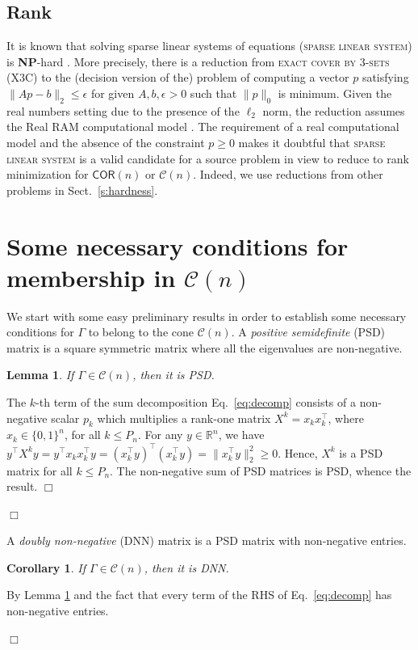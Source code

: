 \documentclass[envcountsect,envcountsame]{svjour3}
\theoremstyle{changebreak}                %
\newtheorem{lemma}[result]{Lemma}
\newtheorem{corollary}[result]{Corollary}
\newenvironment{proof}
 {{\sl Proof.}\hspace*{1 ex}}%
 {{\nopagebreak\hspace*{\fill}$\Box$\par\vspace{12pt}}}
\newcommand{\qed}{\hfill \ensuremath{\Box}}
\newcommand{\transpose}[1]{{#1}^{\top}}
\newcommand{\COR}[1]{\mathsf{COR}(#1)}
\newcommand{\CONX}[1]{\mathcal{C}(#1)}
\begin{document}
\subsection{Rank}
It is known that solving sparse linear systems of equations (\textsc{sparse linear system}) is \textbf{NP}-hard \cite{natarajan}. More precisely, there is a reduction from \textsc{exact cover by 3-sets} (X3C) to the (decision version of the) problem of computing a vector $p$ satisfying $\|Ap-b\|_2\le\epsilon$ for given $A,b,\epsilon>0$ such that $\|p\|_0$ is minimum. Given the real numbers setting due to the presence of the $\ell_2$ norm, the reduction assumes the Real RAM computational model \cite[\S 1.4]{preparata}. The requirement of a real computational model and the absence of the constraint $p\ge 0$ makes it doubtful that \textsc{sparse linear system} is a valid candidate for a source problem in view to reduce to rank minimization for $\COR{n}$ or $\CONX{n}$. Indeed, we use reductions from other problems in Sect.~\ref{s:hardness}. 

\section{Some necessary conditions for membership in $\CONX{n}$}
\label{s:prelim}
We start with some easy preliminary results in order to establish some necessary conditions for $\Gamma$ to belong to the cone $\CONX{n}$. A \textit{positive semidefinite} (PSD) matrix is a square symmetric matrix where all the eigenvalues are non-negative.
\begin{lemma}
  If $\Gamma\in\CONX{n}$, then it is PSD. \label{lem:necexact2}
\end{lemma}
\begin{proof}
  The $k$-th term of the sum decomposition Eq.~\eqref{eq:decomp} consists of a non-negative scalar $p_k$ which multiplies a rank-one matrix $X^k=x_k\transpose{x}_k$, where $x_k\in\{0,1\}^n$, for all $k\le P_n$. For any $y\in\mathbb{R}^n$, we have $\transpose{y}X^ky=\transpose{y}x_k\transpose{x}_ky=\transpose{(\transpose{x}_ky)}(\transpose{x}_ky)=\|\transpose{x}_ky\|_2^2\ge 0$. Hence, $X^k$ is a PSD matrix for all $k\le P_n$. The non-negative sum of PSD matrices is PSD, whence the result. \ifspringer\qed\fi
\end{proof}
A \textit{doubly non-negative} (DNN) matrix is a PSD matrix with non-negative entries. %
\begin{corollary}
  If $\Gamma\in\CONX{n}$, then it is DNN.
  \label{cor:dnn}
\end{corollary}
\begin{proof}
  By Lemma \ref{lem:necexact2} and the fact that every term of the RHS of Eq.~\eqref{eq:decomp} has non-negative entries.
\end{proof}
\end{document}
